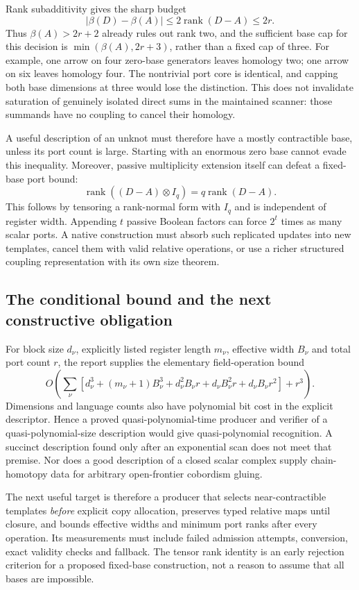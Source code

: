Rank subadditivity gives the sharp budget
\[
 |\beta(D)-\beta(A)|\le2\operatorname{rank}(D-A)\le2r.
\]
Thus $\beta(A)>2r+2$ already rules out rank two, and the sufficient base cap
for this decision is $\min(\beta(A),2r+3)$, rather than a fixed cap of three.
For example, one arrow on four zero-base generators leaves homology two;
one arrow on six leaves homology four. The nontrivial port core is identical,
and capping both base dimensions at three would lose the distinction.
This does not invalidate saturation of genuinely isolated direct sums in the
maintained scanner: those summands have no coupling to cancel their homology.

A useful description of an unknot must therefore have a mostly contractible
base, unless its port count is large. Starting with an enormous zero base
cannot evade this inequality. Moreover, passive multiplicity extension itself
can defeat a fixed-base port bound:
\[
 \operatorname{rank}((D-A)\otimes I_q)
       =q\operatorname{rank}(D-A).
\]
This follows by tensoring a rank-normal form with $I_q$ and is independent of
register width. Appending $t$ passive Boolean factors can force $2^t$ times
as many scalar ports. A native construction must absorb such replicated
updates into new templates, cancel them with valid relative operations, or
use a richer structured coupling representation with its own size theorem.

\subsection{The conditional bound and the next constructive obligation}
For block size $d_\nu$, explicitly listed register length $m_\nu$, effective
width $B_\nu$ and total port count $r$, the report supplies the elementary
field-operation bound
\[
 O\!\left(\sum_\nu\left[d_\nu^3+(m_\nu+1)B_\nu^3+
 d_\nu^2B_\nu r+d_\nu B_\nu^2r+d_\nu B_\nu r^2\right]+r^3\right).
\]
Dimensions and language counts also have polynomial bit cost in the explicit
descriptor. Hence a proved quasi-polynomial-time producer and verifier of a
quasi-polynomial-size description would give quasi-polynomial recognition.
A succinct description found only after an exponential scan does not meet
that premise. Nor does a good description of a closed scalar complex supply
chain-homotopy data for arbitrary open-frontier cobordism gluing.

The next useful target is therefore a producer that selects near-contractible
templates \emph{before} explicit copy allocation, preserves typed relative
maps until closure, and bounds effective widths and minimum port ranks after
every operation. Its measurements must include failed admission attempts,
conversion, exact validity checks and fallback. The tensor rank identity is
an early rejection criterion for a proposed fixed-base construction, not a
reason to assume that all bases are impossible.

